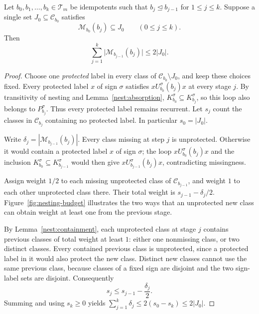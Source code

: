 \begin{proposition}
\label{nest:chain}
Let $b_0,b_1,\ldots,b_k\in\mathcal T_m$ be idempotents such that
$b_j\trianglelefteq b_{j-1}$ for $1\leq j\leq k$.
Suppose a single set $J_0\subseteq\mathcal C_{b_0}$ satisfies
\[
 \mathcal M_{b_0}(b_j)\subseteq J_0
 \qquad(0\leq j\leq k).
\]
Then
\begin{equation}
\label{nest:chain-bound}
 \sum_{j=1}^k\bigl|\mathcal M_{b_{j-1}}(b_j)\bigr|
 \leq 2|J_0|.
\end{equation}
\end{proposition}

\begin{proof}
Choose one \emph{protected} label in every class of
$\mathcal C_{b_0}\setminus J_0$, and keep these choices fixed.
Every protected label $x$ of sign $\sigma$ satisfies
$xU_{b_0}^\sigma(b_j)x$ at every stage $j$.
By transitivity of nesting and Lemma~\ref{nest:absorption},
$K_{b_0}^\sigma\subseteq K_{b_j}^\sigma$, so this loop also belongs
to $P_{b_j}^\sigma$. Thus every protected label remains recurrent.
Let $s_j$ count the classes in $\mathcal C_{b_j}$ containing no
protected label. In particular $s_0=|J_0|$.

Write $\delta_j=|\mathcal M_{b_{j-1}}(b_j)|$.
Every class missing at step $j$ is unprotected. Otherwise it would
contain a protected label $x$ of sign $\sigma$; the loop
$xU_{b_0}^\sigma(b_j)x$ and the inclusion
$K_{b_0}^\sigma\subseteq K_{b_{j-1}}^\sigma$ would then give
$xU_{b_{j-1}}^\sigma(b_j)x$, contradicting missingness.

Assign weight $1/2$ to each missing unprotected class of
$\mathcal C_{b_{j-1}}$, and weight $1$ to each other unprotected
class there. Their total weight is $s_{j-1}-\delta_j/2$.
Figure~\ref{fig:nesting-budget} illustrates the two ways that an
unprotected new class can obtain weight at least one from the previous
stage.



By Lemma~\ref{nest:containment}, each unprotected class at stage $j$
contains previous classes of total weight at least $1$:
either one nonmissing class, or two distinct classes.
Every contained previous class is unprotected, since a protected
label in it would also protect the new class.
Distinct new classes cannot use the same previous class, because
classes of a fixed sign are disjoint and the two sign-label sets
are disjoint. Consequently
\[
 s_j\leq s_{j-1}-\frac{\delta_j}{2}.
\]
Summing and using $s_k\geq0$ yields
$\sum_{j=1}^k\delta_j\leq2(s_0-s_k)\leq2|J_0|$.
\end{proof}
